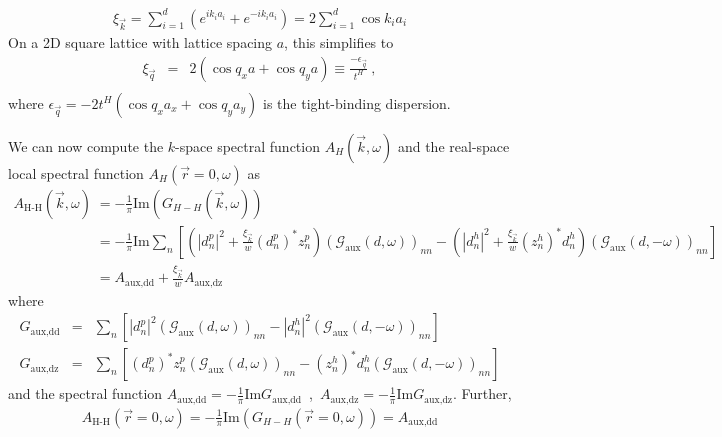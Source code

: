 \documentclass{report}
\numberwithin{equation}{section}
\begin{document}
\begin{equation}\begin{aligned}
	\xi_{\vec k} = \sum_{i=1}^d \left(e^{i k_i {a_i}} + e^{-i k_i {a_i}}\right) = 2\sum_{i=1}^d \cos k_i a_i
\end{aligned}\end{equation}
On a 2D square lattice with lattice spacing $a$, this simplifies to
\begin{eqnarray}
	\label{2dsquaretb}
\xi_{\vec{q}} &=& 2(\cos q_{x}a + \cos q_{y}a)\equiv \frac{-\epsilon_{\vec{q}}}{t^{H}}~,\nonumber\\
\end{eqnarray}
where \(\epsilon_{\vec{q}} = -2t^{H}(\cos q_{x}a_{x} + \cos q_{y}a_{y})\) is the tight-binding dispersion.

We can now compute the $k$-space spectral function $A_{H}(\vec{k},\omega)$ and the real-space local spectral function $A_{H}(\vec{r}=0,\omega)$ as
\begin{equation}\begin{aligned}
	A_\text{H-H}(\vec{k},\omega) &= -\frac{1}{\pi} \textrm{Im}(G_{H-H}(\vec{k},\omega))\\ 
	&= -\frac{1}{\pi} \textrm{Im}\sum_n\left[\left(|d^p_n|^2 + \frac{\xi_{\vec k}}{w}\left(d^p_n\right)^* z^p_n\right) \left(\mathcal{G}_\text{aux}(d, \omega)\right)_{nn} - \left(|d^h_n|^2 + \frac{\xi_{\vec k}}{w}\left(z^h_n\right)^* d^h_n\right)\left(\mathcal{G}_\text{aux}(d, -\omega)\right)_{nn}\right]\\
	&= A_\text{aux,dd} + \frac{\xi_{\vec k}}{w} A_\text{aux,dz}
\end{aligned}\end{equation}
where 
\begin{eqnarray}
G_\text{aux,dd} &=& \sum_n\left[|d^p_n|^2 \left(\mathcal{G}_\text{aux}(d, \omega)\right)_{nn} - |d^h_n|^2 \left(\mathcal{G}_\text{aux}(d, -\omega)\right)_{nn}\right]\nonumber\\
G_\text{aux,dz} &=& \sum_n\left[\left(d^p_n\right)^* z^p_n \left(\mathcal{G}_\text{aux}(d, \omega)\right)_{nn} - \left(z^h_n\right)^* d^h_n \left(\mathcal{G}_\text{aux}(d, -\omega)\right)_{nn}\right]
\end{eqnarray}
and the spectral function $A_\text{aux,dd}=-\frac{1}{\pi}\textrm{Im}G_\text{aux,dd}$~,~$A_\text{aux,dz}=-\frac{1}{\pi}\textrm{Im}G_\text{aux,dz}$.
Further,
\begin{equation}\begin{aligned}
A_\text{H-H}(\vec{r}=0,\omega) = -\frac{1}{\pi} \textrm{Im}(G_{H-H}(\vec{r}=0,\omega)) 
= A_\text{aux,dd}
\label{main}
\end{aligned}\end{equation}
\end{document}
